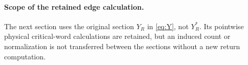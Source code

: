 \documentclass[11pt,reqno]{amsart}
\numberwithin{equation}{section}
\theoremstyle{definition}\newtheorem{definition}[theorem]{Definition}
\theoremstyle{remark}\newtheorem{remark}[theorem]{Remark}
\begin{document}
\paragraph{Scope of the retained edge calculation.}
The next section uses the original section $Y_R$ in \eqref{eq:Y}, not
$Y_R^*$. Its pointwise physical critical-word calculations are retained,
but an induced count or normalization is not transferred between the
sections without a new return computation.







\clearpage

\end{document}

